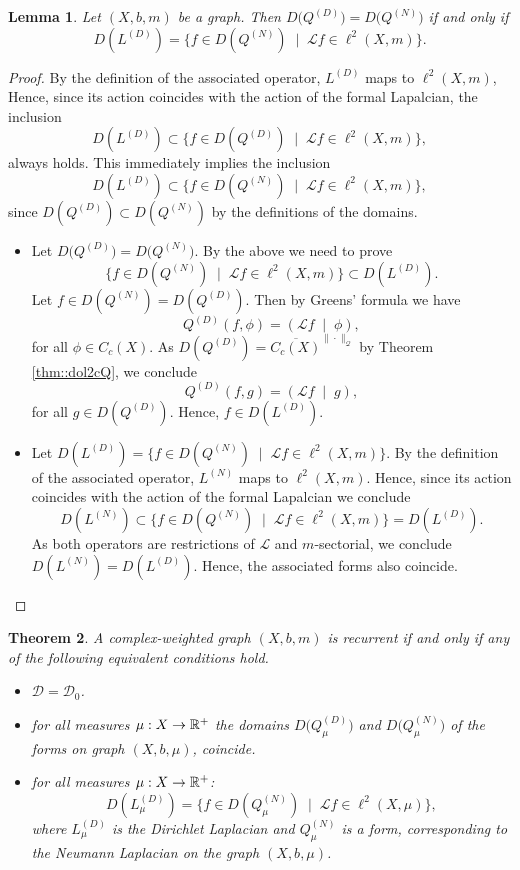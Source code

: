 \documentclass[a4paper,11pt]{amsart}
\newtheorem{theorem}{Theorem}[section]
\newtheorem{lemma}[theorem]{Lemma}
\theoremstyle{definition}
\renewcommand{\L}{\mathcal{L}}
\newcommand{\D}{\mathcal{D}}
\begin{document}
\begin{lemma}\label{lem::DlDell2}
Let $(X,b,m)$ be a graph. Then  $D\big(Q^{(D)}\big)=D\big(Q^{(N)}\big)$ if and only if
$$
D(L^{(D)})=\{f\in D(Q^{(N)})\;\mid\; \L f\in \ell^2(X,m)\}.
$$


\end{lemma}

\begin{proof}
By the definition of the associated operator, $L^{(D)}$ maps to $\ell^2(X,m)$, Hence, since its action coincides with the action of the formal Lapalcian, the inclusion
\begin{equation*}\label{eq::incl}
D(L^{(D)})\subset\{f\in D(Q^{(D)})\;\mid\; \L f\in \ell^2(X,m)\},
\end{equation*}
always holds. This immediately implies the inclusion 
$$
D(L^{(D)})\subset\{f\in D(Q^{(N)})\;\mid\; \L f\in \ell^2(X,m)\},
$$
since $D(Q^{(D)})\subset D(Q^{(N)})$ by the definitions of the domains.
\begin{itemize}[leftmargin=*]
\item
Let $D\big(Q^{(D)}\big)=D\big(Q^{(N)}\big)$.  By the above we need to prove 
$$
\{f\in D(Q^{(N)})\;\mid\; \L f\in \ell^2(X,m)\}\subset D(L^{(D)}).
$$
Let $f\in D(Q^{(N)})=D(Q^{(D)})$. Then by Greens' formula we have
$$
Q^{(D)}(f, \phi)=(\L f\;\mid\;\phi),
$$
for all $\phi\in C_c(X)$. As $D(Q^{(D)})=\overline{C_c(X)}^{\|\cdot\|_\mathcal Q}$  by Theorem \ref{thm::dol2cQ}, we conclude
$$
Q^{(D)}(f, g)=(\L f\;\mid\;g),
$$
for all $g\in D(Q^{(D)})$. Hence, $f\in D(L^{(D)})$.
\item
Let $D(L^{(D)})=\{f\in D(Q^{(N)})\;\mid\; \L f\in \ell^2(X,m)\}.$ By the definition of the associated operator, $L^{(N)}$ maps to $\ell^2(X,m)$. Hence, since its action coincides with the action of the formal Lapalcian we conclude
$$
D(L^{(N)})\subset \{f\in D(Q^{(N)})\;\mid\; \L f\in \ell^2(X,m)\}=D(L^{(D)}).
$$
As both operators are restrictions of $\L$ and $m$-sectorial, we conclude $D(L^{(N)})= D(L^{(D)}).$ Hence, the associated forms also coincide.
\end{itemize}
\end{proof}


\begin{theorem}
A complex-weighted graph $(X,b,m)$ is recurrent if and only if any of the following equivalent conditions hold.
\begin{itemize}
\item[{\em(i)}]
$\D=\D_0$.
\item[{\em(ii)}]
for all measures $\mu:X\to \Bbb R^+$ the domains $D\big(Q_\mu^{(D)}\big)$ and $D\big(Q_\mu^{(N)}\big)$ of the forms on graph $(X,b,\mu)$,  coincide.
\item[{\em(iii)}]
for all measures $\mu:X\to \Bbb R^+$:
$$
D(L_\mu^{(D)})=\{f\in D(Q_\mu^{(N)})\;\mid\; \L f\in \ell^2(X,\mu)\},
$$
where $L_\mu^{(D)}$ is the Dirichlet Laplacian and $Q_\mu^{(N)}$ is a form, corresponding to the Neumann Laplacian on the graph $(X,b,\mu)$.
\end{itemize}

\end{theorem}
\end{document}
